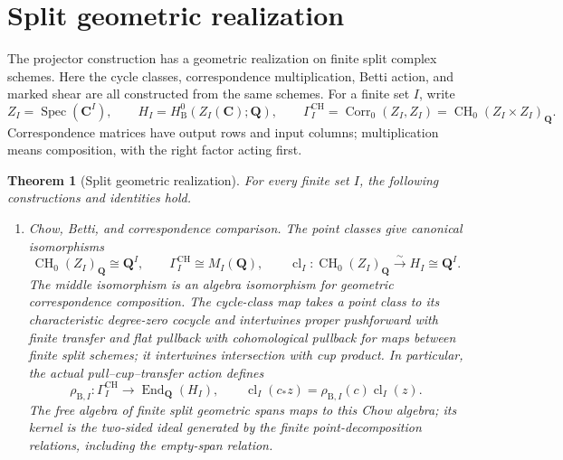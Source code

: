 \documentclass[11pt]{article}
\newtheorem{theorem}{Theorem}[section]
\theoremstyle{definition}
\theoremstyle{remark}
\DeclareMathOperator{\Spec}{Spec}
\DeclareMathOperator{\Corr}{Corr}
\DeclareMathOperator{\End}{End}
\DeclareMathOperator{\CH}{CH}
\newcommand{\Q}{\mathbf Q}
\begin{document}
\section{Split geometric realization}
\label{sec:split-points}

The projector construction has a geometric realization on finite split
complex schemes.  Here the cycle classes, correspondence multiplication,
Betti action, and marked shear are all constructed from the same schemes.
For a finite set \(I\), write
\[
 Z_I=\Spec(\mathbf C^I),\qquad
 H_I=H^0_{\mathrm B}(Z_I(\mathbf C);\Q),\qquad
 \Gamma_I^{\mathrm{CH}}=\Corr_0(Z_I,Z_I)
                     =\CH_0(Z_I\times Z_I)_{\Q}.
\]
Correspondence matrices have output rows and input columns; multiplication
means composition, with the right factor acting first.

\begin{theorem}[Split geometric realization]
\label{thm:split-geometric-realization}
For every finite set \(I\), the following constructions and identities hold.

\begin{enumerate}[label=\textup{(\roman*)},leftmargin=*]
\item \emph{Chow, Betti, and correspondence comparison.}
The point classes give canonical isomorphisms
\[
 \CH_0(Z_I)_{\Q}\cong\Q^I,\qquad
 \Gamma_I^{\mathrm{CH}}\cong M_I(\Q),\qquad
 \operatorname{cl}_I:\CH_0(Z_I)_{\Q}\xrightarrow{\sim}H_I\cong\Q^I.
\]
The middle isomorphism is an algebra isomorphism for geometric
correspondence composition.  The cycle-class map takes a point class to
its characteristic degree-zero cocycle and intertwines proper
pushforward with finite transfer and flat pullback with cohomological
pullback for maps between finite split schemes; it intertwines
intersection with cup product.  In particular, the actual
pull--cup--transfer action defines
\[
 \rho_{\mathrm B,I}:\Gamma_I^{\mathrm{CH}}\longrightarrow\End_{\Q}(H_I),
 \qquad
 \operatorname{cl}_I(c_*z)=\rho_{\mathrm B,I}(c)\operatorname{cl}_I(z).
\]
The free algebra of finite split geometric spans maps to this Chow
algebra; its kernel is the two-sided ideal generated by the finite
point-decomposition relations, including the empty-span relation.


\end{enumerate}
\end{theorem}
\end{document}

